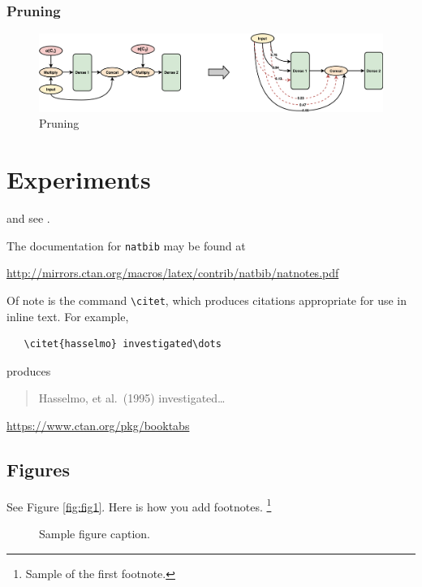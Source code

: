 \usepackage{}\documentclass{article}
\begin{document}
\subsubsection{Pruning}
\begin{figure}[h!]
\centering
\includegraphics[scale=0.1]{Pruning.png}
\caption{Pruning}
\label{fig:infotransfer}
\end{figure}

\section{Experiments}
\label{sec:others}
\lipsum[8] \cite{kour2014real,kour2014fast} and see \cite{hadash2018estimate}.

The documentation for \verb+natbib+ may be found at
\begin{center}
  \url{http://mirrors.ctan.org/macros/latex/contrib/natbib/natnotes.pdf}
\end{center}
Of note is the command \verb+\citet+, which produces citations
appropriate for use in inline text.  For example,
\begin{verbatim}
   \citet{hasselmo} investigated\dots
\end{verbatim}
produces
\begin{quote}
  Hasselmo, et al.\ (1995) investigated\dots
\end{quote}

\begin{center}
  \url{https://www.ctan.org/pkg/booktabs}
\end{center}


\subsection{Figures}
\lipsum[10] 
See Figure \ref{fig:fig1}. Here is how you add footnotes. \footnote{Sample of the first footnote.}
\lipsum[11] 

\begin{figure}
  \centering
  \fbox{\rule[-.5cm]{4cm}{4cm} \rule[-.5cm]{4cm}{0cm}}
  \caption{Sample figure caption.}
\end{figure}
\end{document}
